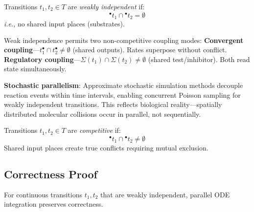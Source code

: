 \vspace{3pt}
\begin{definition}
Transitions $t_1, t_2 \in T$ are \textit{weakly independent} if:
\[
{}^\bullet t_1 \cap {}^\bullet t_2 = \emptyset
\]
\textit{i.e.}, no shared input places (substrates).
\end{definition}

\vspace{3pt}
\noindent Weak independence permits two non-competitive coupling modes: \textbf{Convergent coupling}---$t_1^\bullet \cap t_2^\bullet \neq \emptyset$ (shared outputs). Rates superpose without conflict. \textbf{Regulatory coupling}---$\Sigma(t_1) \cap \Sigma(t_2) \neq \emptyset$ (shared test/inhibitor). Both read state simultaneously.

\vspace{3pt}
\noindent\textbf{Stochastic parallelism}: Approximate stochastic simulation methods decouple reaction events within time intervals, enabling concurrent Poisson sampling for weakly independent transitions. This reflects biological reality---spatially distributed molecular collisions occur in parallel, not sequentially.

\vspace{3pt}
\begin{definition}
Transitions $t_1, t_2 \in T$ are \textit{competitive} if:
\[
{}^\bullet t_1 \cap {}^\bullet t_2 \neq \emptyset
\]
Shared input places create true conflicts requiring mutual exclusion.
\end{definition}

\subsection{Correctness Proof}

\begin{theorem}
For continuous transitions $t_1, t_2$ that are weakly independent, parallel ODE integration preserves correctness.
\end{theorem}

